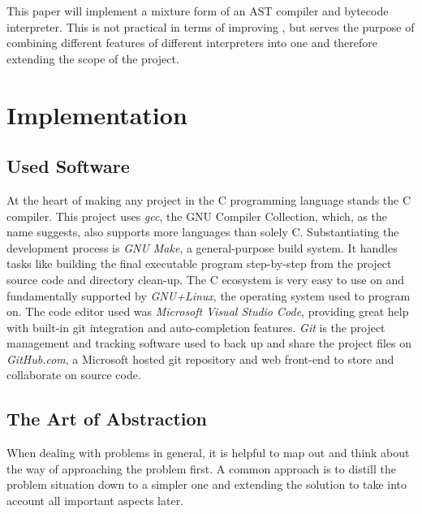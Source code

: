 \documentclass[12pt,a4paper]{report}
\begin{document}
This paper will implement a mixture form of an AST compiler and bytecode
interpreter. This is not practical in terms of improving \name, but serves
the purpose of combining different features of different interpreters into one
and therefore extending the scope of the project.


\section{Implementation}
\subsection{Used Software}
At the heart of making any project in the C programming language
stands the C compiler. This project uses
\emph{gcc}, the GNU Compiler Collection, which, as the name suggests, also 
supports more languages than solely C. Substantiating the development process is 
\emph{GNU Make}, a general-purpose build system. It handles tasks like building
the final executable program step-by-step from the project source code and directory clean-up.
The C ecosystem is very easy to use on and fundamentally supported by 
\emph{GNU+Linux}, the operating system used to program on.
The code editor used was \emph{Microsoft Visual Studio Code}, providing great
help with built-in git integration and auto-completion features.
\emph{Git} is the project management and tracking software used to back up and share
the project files on \emph{GitHub.com}, a Microsoft hosted git repository and
web front-end to store and collaborate on source code.

\subsection{The Art of Abstraction}
When dealing with problems in general, it is helpful to map out and think about
the way of approaching the problem first. A common approach is to distill the
problem situation down to a simpler one and extending the solution to take into
account all important aspects later.
\end{document}
